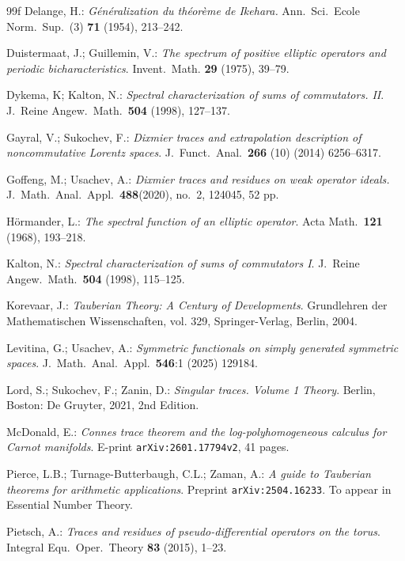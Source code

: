 \documentclass[10pt, a4paper]{amsart}
\numberwithin{equation}{section}
\theoremstyle{definition}
\theoremstyle{remark}
\begin{document}
\begin{thebibliography}{99f}
 Delange, H.: \emph{G\'en\'eralization du th\'eor\`eme de Ikehara.} Ann.\ Sci.\ Ecole Norm.\ Sup.\ (3) \textbf{71} (1954), 213--242.

 Duistermaat, J.; Guillemin, V.: \emph{The spectrum of positive elliptic operators and periodic bicharacteristics}.  Invent.\ Math. \textbf{29} (1975), 39--79.

 Dykema, K;  Kalton, N.: \emph{Spectral characterization of sums of commutators. II}.
J.\ Reine Angew.\ Math.\  \textbf{504} (1998), 127--137.

 Gayral, V.; Sukochev, F.: \emph{Dixmier traces and extrapolation description of noncommutative Lorentz spaces}. J.\ Funct.\ Anal.\
\textbf{266} (10) (2014) 6256--6317.

 Goffeng, M.; Usachev, A.: \emph{Dixmier traces and residues on weak operator ideals.}
J.\ Math.\ Anal.\ Appl.\ \textbf{488}(2020), no.\ 2, 124045, 52 pp.

 H\"ormander, L.: \emph{The spectral function of an elliptic operator}. Acta Math.\ \textbf{121} (1968), 193--218.

 Kalton, N.: \emph{Spectral characterization of sums of commutators I}.  J.\ Reine Angew.\ Math.\ \textbf{504} (1998), 115--125.

 Korevaar, J.: \emph{Tauberian Theory: A Century of Developments}. Grundlehren der Mathematischen Wissenschaften, vol. 329, Springer-Verlag, Berlin, 2004.

 Levitina, G.; Usachev, A.: \emph{Symmetric functionals on simply generated symmetric spaces}. J.\ Math.\ Anal.\ Appl.\ \textbf{546}:1 (2025) 129184. 

 Lord, S.; Sukochev, F.; Zanin, D.: \emph{Singular traces. Volume 1 Theory}. Berlin, Boston: De Gruyter, 2021, 2nd Edition.

 McDonald, E.: \emph{Connes trace theorem and the log-polyhomogeneous calculus for Carnot manifolds}. E-print \texttt{arXiv:2601.17794v2}, 41 pages. 

 Pierce, L.B.;  Turnage-Butterbaugh, C.L.; Zaman, A.: \emph{A guide to Tauberian theorems for arithmetic applications}. Preprint \texttt{arXiv:2504.16233}. To appear in Essential Number Theory.

 Pietsch, A.: \emph{Traces and residues of pseudo-differential operators on the torus}. Integral Equ.\  Oper.\ Theory \textbf{83} (2015), 1--23.


\end{thebibliography}
\end{document}

